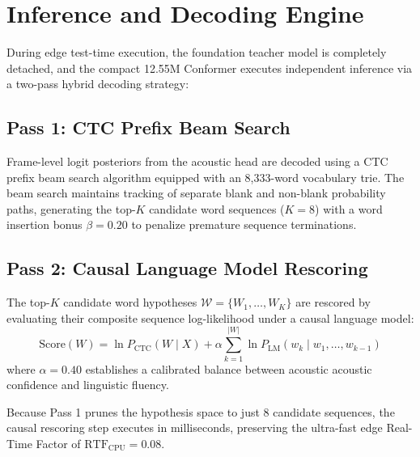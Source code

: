 \section{Inference and Decoding Engine}
During edge test-time execution, the foundation teacher model is completely detached, and the compact 12.55M Conformer executes independent inference via a two-pass hybrid decoding strategy:

\subsection{Pass 1: CTC Prefix Beam Search}
Frame-level logit posteriors from the acoustic head are decoded using a CTC prefix beam search algorithm equipped with an 8,333-word vocabulary trie. The beam search maintains tracking of separate blank and non-blank probability paths, generating the top-$K$ candidate word sequences ($K = 8$) with a word insertion bonus $\beta = 0.20$ to penalize premature sequence terminations.

\subsection{Pass 2: Causal Language Model Rescoring}
The top-$K$ candidate word hypotheses $\mathcal{W} = \{W_1, \dots, W_K\}$ are rescored by evaluating their composite sequence log-likelihood under a causal language model:
\begin{equation}
    \text{Score}(W) = \ln P_{\text{CTC}}(W \mid X) + \alpha \sum_{k=1}^{|W|} \ln P_{\text{LM}}(w_k \mid w_1, \dots, w_{k-1})
\end{equation}
where $\alpha = 0.40$ establishes a calibrated balance between acoustic acoustic confidence and linguistic fluency.

Because Pass 1 prunes the hypothesis space to just 8 candidate sequences, the causal rescoring step executes in milliseconds, preserving the ultra-fast edge Real-Time Factor of $\text{RTF}_{\text{CPU}} = 0.08$.
